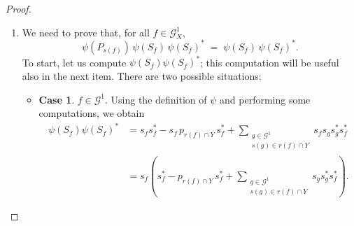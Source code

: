 \documentclass[12pt, reqno]{amsart}
\theoremstyle{definition}
\theoremstyle{remark}
\numberwithin{equation}{section}
\begin{document}
\begin{proof}
\begin{enumerate}
The remaining case is when $f = e'$ for some $e \in \mathcal{G}^1$. In this situation,
$r(f) = r(e') = \emptyset \cup (r(e) \cap Y)'$, and thus
\[
\psi(P_{r(f)})
=
\psi(P_{r(e')})
=
\sum_{\substack{w \in \mathcal{G}^0 \\ w \in r(e) \cap Y}} q_w
=
p_{r(e) \cap Y}
-
\sum_{\substack{g \in \mathcal{G}^1 \\ s(g) \in r(e) \cap Y}} s_g s_g^*,
\]
where the last equality holds because the right-hand side is the left-hand side after reordering
the sum. Moreover, a computation shows that
\begin{align*}
\psi(S_f)^*\psi(S_f)
&=
\left(
s_e  p_{r(e) \cap Y}
-
\sum_{\substack{g \in \mathcal{G}^1 \\ s(g) \in r(e) \cap Y}} s_e s_g s_g^*
\right)^{\!*}
\left(
s_e  p_{r(e) \cap Y}
-
\sum_{\substack{g \in \mathcal{G}^1 \\ s(g) \in r(e) \cap Y}} s_e s_g s_g^*
\right) \\
&=
\left(
p_{r(e) \cap Y} s_e^*
-
\sum_{\substack{g \in \mathcal{G}^1 \\ s(g) \in r(e) \cap Y}} s_g s_g^* s_e^*
\right)
\left(
s_e  p_{r(e) \cap Y}
-
\sum_{\substack{g \in \mathcal{G}^1 \\ s(g) \in r(e) \cap Y}} s_e s_g s_g^*
\right) \\
&=
p_{r(e) \cap Y}
-
\sum_{\substack{g \in \mathcal{G}^1 \\ s(g) \in r(e) \cap Y}} s_g s_g^*
-
\sum_{\substack{g \in \mathcal{G}^1 \\ s(g) \in r(e) \cap Y}} s_g s_g^*
+
\sum_{\substack{g \in \mathcal{G}^1 \\ s(g) \in r(e) \cap Y}} s_g s_g^* \\
&=
p_{r(e) \cap Y}
-
\sum_{\substack{g \in \mathcal{G}^1 \\ s(g) \in r(e) \cap Y}} s_g s_g^*
=
\psi(P_{r(f)}).
\end{align*}

\item We need to prove that, for all $f \in \mathcal{G}_X^1$,
\[
\psi(P_{s(f)}) \,\psi(S_f)\, \psi(S_f)^* \;=\; \psi(S_f)\, \psi(S_f)^*.
\]
To start, let us compute $\psi(S_f) \psi(S_f)^*$; this computation will be useful also in the next
item. There are two possible situations:

\begin{itemize}
\item \textbf{Case 1}. $f \in \mathcal{G}^1$. Using the definition of $\psi$ and performing some computations, we obtain
\begin{align*}
\psi(S_f)\psi(S_f)^*
&= s_f s_f^* - s_f\, p_{r(f)\cap Y}\, s_f^*
  + \sum_{\substack{g\in\mathcal{G}^1\\ s(g)\in r(f)\cap Y}}
    s_f s_g s_g^* s_f^* \\[2pt]
&= s_f\!\left(
    s_f^* - p_{r(f)\cap Y}\, s_f^*
    + \sum_{\substack{g\in\mathcal{G}^1\\ s(g)\in r(f)\cap Y}}
      s_g s_g^* s_f^*
  \right).
\end{align*}


\end{itemize}
\end{enumerate}
\end{proof}
\end{document}
